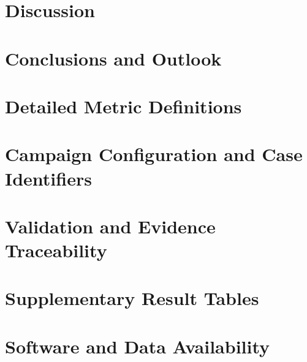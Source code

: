 \documentclass[
  a4paper,
  thesis=student,
  english,
  coverpage=false,
  titlepage=false,
  oneside,
  headmarks=true
]{tumbook}
\begin{document}
\chapter{Discussion}


\chapter{Conclusions and Outlook}


\appendix
\chapter{Detailed Metric Definitions}

\chapter{Campaign Configuration and Case Identifiers}

\chapter{Validation and Evidence Traceability}

\chapter{Supplementary Result Tables}

\chapter{Software and Data Availability}


\backmatter


\end{document}
